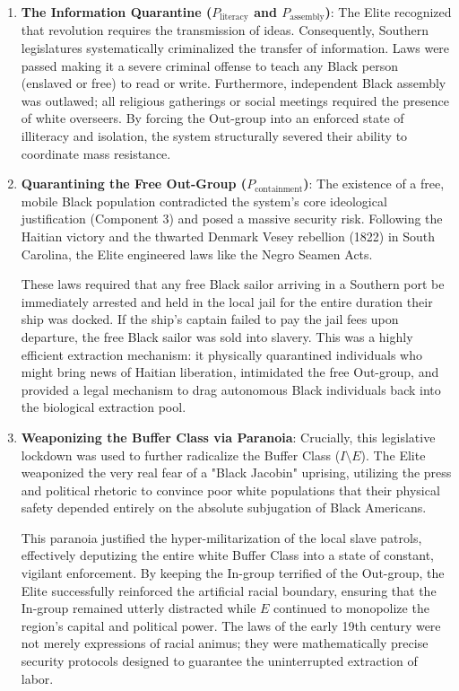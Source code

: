 \documentclass[12pt,openany]{book}
\begin{document}
\begin{enumerate}
    \item \textbf{The Information Quarantine ($P_{\text{literacy}}$ and $P_{\text{assembly}}$)}: The Elite recognized that revolution requires the transmission of ideas. Consequently, Southern legislatures systematically criminalized the transfer of information. Laws were passed making it a severe criminal offense to teach any Black person (enslaved or free) to read or write. Furthermore, independent Black assembly was outlawed; all religious gatherings or social meetings required the presence of white overseers. By forcing the Out-group into an enforced state of illiteracy and isolation, the system structurally severed their ability to coordinate mass resistance.
    
    \item \textbf{Quarantining the Free Out-Group ($P_{\text{containment}}$)}: The existence of a free, mobile Black population contradicted the system’s core ideological justification (Component 3) and posed a massive security risk. Following the Haitian victory and the thwarted Denmark Vesey rebellion (1822) in South Carolina, the Elite engineered laws like the Negro Seamen Acts.
    
    These laws required that any free Black sailor arriving in a Southern port be immediately arrested and held in the local jail for the entire duration their ship was docked. If the ship's captain failed to pay the jail fees upon departure, the free Black sailor was sold into slavery. This was a highly efficient extraction mechanism: it physically quarantined individuals who might bring news of Haitian liberation, intimidated the free Out-group, and provided a legal mechanism to drag autonomous Black individuals back into the biological extraction pool.
    
    \item \textbf{Weaponizing the Buffer Class via Paranoia}: Crucially, this legislative lockdown was used to further radicalize the Buffer Class ($I \setminus E$). The Elite weaponized the very real fear of a "Black Jacobin" uprising, utilizing the press and political rhetoric to convince poor white populations that their physical safety depended entirely on the absolute subjugation of Black Americans.
    
    This paranoia justified the hyper-militarization of the local slave patrols, effectively deputizing the entire white Buffer Class into a state of constant, vigilant enforcement. By keeping the In-group terrified of the Out-group, the Elite successfully reinforced the artificial racial boundary, ensuring that the In-group remained utterly distracted while $E$ continued to monopolize the region's capital and political power. The laws of the early 19th century were not merely expressions of racial animus; they were mathematically precise security protocols designed to guarantee the uninterrupted extraction of labor.
\end{enumerate}
\end{document}
